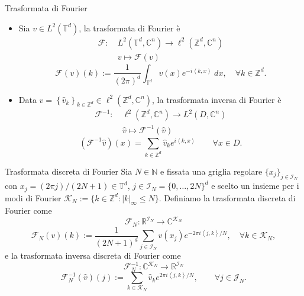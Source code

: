 \documentclass{beamer}
\newcommand{\numberset}{\mathbb}
\newcommand{\N}{\numberset{N}}
\newcommand{\Z}{\numberset{Z}}
\newcommand{\R}{\numberset{R}}
\newcommand{\C}{\numberset{C}}
\begin{document}

\backmatter %

\appendix
\begin{frame}[noframenumbering]{Trasformata di Fourier}
	\centering
	\begin{itemize}
		\item  Sia $ v \in  L^2(\mathbb{T}^d) $, la trasformata di Fourier è
		\[ \begin{split}
			\mathcal{F} : \ & L^{2}(\mathbb{T}^d, \C^{n})\to \ell^{2}(\Z^d, \C^{n})\\
			& v \mapsto \mathcal{F}(v)
		\end{split} \]
		\[ \mathcal{F}(v)(k) := \frac{1}{(2 \pi)^{d}} \int_{\mathbb{T}^{d}}v(x) e^{-i \left\langle k , x \right\rangle} \ dx,  \quad \forall k \in \Z^d. \]
		\item Data $ \widehat{v} = \left\lbrace \widehat{v}_k\right\rbrace_{k \in \Z^d} \in \ell^{2}(\Z^d, \C^{n}) $, la trasformata inversa di Fourier è
		\[ \begin{split}
			\mathcal{F}^{-1} : \ & \ell^{2}(\Z^d, \C^{n}) \to L^{2}(D, \C^{n})\\
			& \widehat{v} \mapsto \mathcal{F}^{-1}(\widehat{v})
		\end{split} \]
		\[ (\mathcal{F}^{-1}\widehat{v})(x) = \sum_{k \in \Z^d} \widehat{v}_k e^{i \left\langle k , x \right\rangle } \qquad \forall x \in D. \]
	\end{itemize}
\end{frame}

\begin{frame}[noframenumbering]{Trasformata discreta di Fourier}
	Sia $ N \in \N $ e fissata una griglia regolare $ \{x_j\}_{j \in \mathcal{I}_N} $ con $ x_j = (2\pi j)/(2N+1) \in \mathbb{T}^d $, $ j \in \mathcal{I}_N = \{0, \dots, 2N\}^{d} $ e scelto un insieme per i modi di Fourier $\mathcal{K}_N := \{k \in \Z^d : |k|_{\infty} \le N\}$.
	Definiamo la trasformata discreta di Fourier come
	\[ \mathcal{F}_{N}: \R^{\mathcal{I}_N} \to \C^{\mathcal{K}_N}\]\[ \mathcal{F}_{N}(v)(k) := \frac{1}{(2N+1)^{d}} \sum_{j \in \mathcal{I}_N}v(x_j) e^{-2\pi i \left\langle j, k \right\rangle/N }, \quad \forall k \in \mathcal{K}_N, \]
	e la trasformata inversa discreta di Fourier come
	\[ \mathcal{F}_{N}^{-1}: \C^{\mathcal{K}_N} \to \R^{\mathcal{I}_N}\]\[ \mathcal{F}_{N}^{-1}(\widehat{v})(j) := \sum_{k \in \mathcal{K}_N} \widehat{v}_k e^{2\pi i \left\langle j, k \right\rangle/N }, \qquad \forall j \in \mathcal{J}_N. \]
\end{frame}
\end{document}
